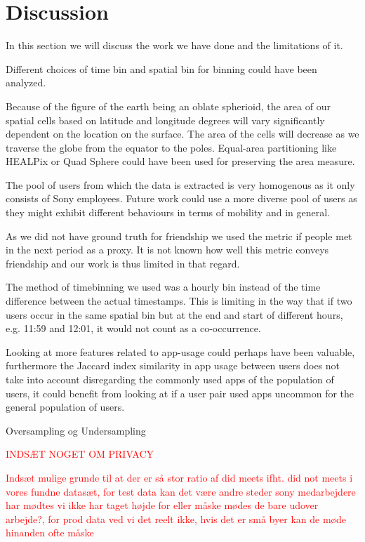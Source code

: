 \chapter{Discussion}
\label{chap:discussion}
In this section we will discuss the work we have done and the limitations of it.

Different choices of time bin and spatial bin for binning could have been analyzed.

Because of the figure of the earth being an oblate spherioid, the area of our spatial cells based on latitude and longitude degrees will vary significantly dependent on the location on the surface. The area of the cells will decrease as we traverse the globe from the equator to the poles. Equal-area partitioning like HEALPix or Quad Sphere could have been used for preserving the area measure.

The pool of users from which the data is extracted is very homogenous as it only consists of Sony employees. Future work could use a more diverse pool of users as they might exhibit different behaviours in terms of mobility and in general.

As we did not have ground truth for friendship we used the metric if people met in the next period as a proxy. It is not known how well this metric conveys friendship and our work is thus limited in that regard.

The method of timebinning we used was a hourly bin instead of the time difference between the actual timestamps. This is limiting in the way that if two users occur in the same spatial bin but at the end and start of different hours, e.g. 11:59 and 12:01, it would not count as a co-occurrence.

Looking at more features related to app-usage could perhaps have been valuable, furthermore the Jaccard index similarity in app usage between users does not take into account disregarding the commonly used apps of the population of users, it could benefit from looking at if a user pair used apps uncommon for the general population of users.

Oversampling og Undersampling

\textcolor{red}{INDSÆT NOGET OM PRIVACY}

\textcolor{red}{Indsæt mulige grunde til at der er så stor ratio af did meets ifht. did not meets i vores fundne datasæt, for test data kan det være andre steder sony medarbejdere har mødtes vi ikke har taget højde for eller måske mødes de bare udover arbejde?, for prod data ved vi det reelt ikke, hvis det er små byer kan de møde hinanden ofte måske}

